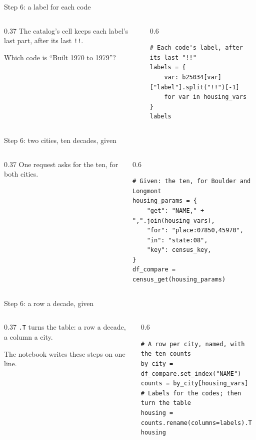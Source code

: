 \documentclass[9pt,aspectratio=169]{beamer}
\begin{document}
\begin{frame}[fragile]{Step 6: a label for each code}
    \begin{columns}[T]
        \begin{column}{0.37\textwidth}
            The catalog's cell keeps each label's last part, after its last \texttt{!!}.

            \medskip
            Which code is ``Built 1970 to 1979''?
        \end{column}
        \begin{column}{0.6\textwidth}
\begin{lstlisting}
# Each code's label, after its last "!!"
labels = {
    var: b25034[var]["label"].split("!!")[-1]
    for var in housing_vars
}
labels
\end{lstlisting}
        \end{column}
    \end{columns}
\end{frame}

\begin{frame}[fragile]{Step 6: two cities, ten decades, given}
    \begin{columns}[T]
        \begin{column}{0.37\textwidth}
            One request asks for the ten, for both cities.
        \end{column}
        \begin{column}{0.6\textwidth}
\begin{lstlisting}
# Given: the ten, for Boulder and Longmont
housing_params = {
    "get": "NAME," + ",".join(housing_vars),
    "for": "place:07850,45970",
    "in": "state:08",
    "key": census_key,
}
df_compare = census_get(housing_params)
\end{lstlisting}
        \end{column}
    \end{columns}
\end{frame}

\begin{frame}[fragile]{Step 6: a row a decade, given}
    \begin{columns}[T]
        \begin{column}{0.37\textwidth}
            \texttt{.T} turns the table: a row a decade, a column a city.

            \medskip
            The notebook writes these steps on one line.
        \end{column}
        \begin{column}{0.6\textwidth}
\begin{lstlisting}
# A row per city, named, with the ten counts
by_city = df_compare.set_index("NAME")
counts = by_city[housing_vars]
# Labels for the codes; then turn the table
housing = counts.rename(columns=labels).T
housing
\end{lstlisting}
        \end{column}
    \end{columns}
\end{frame}
\end{document}
